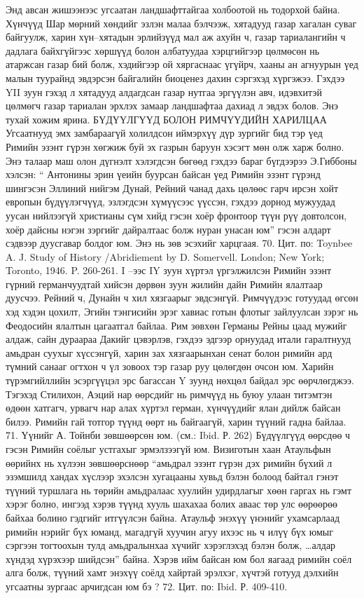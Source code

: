 Энд авсан жишээнээс угсаатан ландшафттайгаа холбоотой нь тодорхой байна. Хүнчүүд Шар мөрний хөндийг эзлэн малаа бэлчээж, хятадууд газар хагалан суваг байгуулж, харин хүн–хятадын эрлийзүүд мал аж ахуйн ч, газар тариалангийн ч дадлага байхгүйгээс хөршүүд болон албатуудаа хэрцгийгээр цөлмөсөн нь атаржсан газар бий болж, хэдийгээр ой хяргаснаас үгүйрч, хааны ан агнуурын үед малын туурайнд эвдэрсэн байгалийн биоценез дахин сэргэхэд хүргэжээ. Гэхдээ YII зуун гэхэд л хятадууд алдагдсан газар нутгаа эргүүлэн авч, идэвхитэй цөлмөгч газар тариалан эрхлэх замаар ландшафтаа дахиад л эвдэх болов. Энэ тухай хожим ярина.
БҮДҮҮЛГҮҮД БОЛОН РИМЧҮҮДИЙН ХАРИЛЦАА
Угсаатнууд эмх замбараагүй холилдсон иймэрхүү дүр зургийг бид тэр үед Римийн эзэнт гүрэн хөгжиж буй эх газрын баруун хэсэгт мөн олж харж болно. Энэ талаар маш олон дүгнэлт хэлэгдсэн бөгөөд гэхдээ бараг бүгдээрээ Э.Гиббоны хэлсэн: “ Антонины эрин үеийн буурсан байсан үед Римийн эзэнт гүрэнд шингэсэн Эллиний нийгэм Дунай, Рейний чанад дахь цөлөөс гарч ирсэн хойт европын бүдүүлэгчүүд, эзлэгдсэн хүмүүсээс үүссэн, гэхдээ дорнод мужуудад уусан нийлээгүй христианы сүм хийд гэсэн хоёр фронтоор түүн рүү довтолсон, хоёр дайсны нэгэн зэргийг дайралтаас болж нуран унасан юм” гэсэн алдарт сэдвээр дуусгавар болдог юм. Энэ нь зөв эсэхийг харцгаая. 70. Цит. по: Toynbee A. J. Study of History /Abridiement by D. Somervell. London; New York; Toronto, 1946. P. 260-261.
I –ээс IY зуун хүртэл үргэлжилсэн Римийн эзэнт гүрний германчуудтай хийсэн дөрвөн зуун жилийн дайн Римийн ялалтаар дуусчээ. Рейний ч, Дунайн ч хил хязгаарыг эвдсэнгүй. Римчүүдээс готуудад өгсөн хэд хэдэн цохилт, Эгийн тэнгисийн эрэг хавиас готын флотыг зайлуулсан зэрэг нь Феодосийн ялалтын цагаатгал байлаа. Рим зөвхөн Германы Рейны цаад мужийг алдаж, сайн дураараа Дакийг цэвэрлэв, гэхдээ эдгээр орнуудад итали гаралтнууд амьдран суухыг хүссэнгүй, харин зах хязгаарынхан сенат болон римийн ард түмний санааг огтхон ч үл зовоох тэр газар руу цөлөгдөн очсон юм. Харийн түрэмгийллийн эсэргүүцэл эрс багассан Y зуунд нөхцөл байдал эрс өөрчлөгджээ. Тэгэхэд Стилихон, Аэций нар өөрсдийг нь римчүүд нь буюу улаан титэмтэн өдөөн хатгагч, урвагч нар алах хүртэл герман, хүнчүүдийг ялан дийлж байсан билээ. Римийн гай тотгор түүнд өөрт нь байгаагүй, харин түүний гадна байлаа. 71. Үүнийг А. Тойнби зөвшөөрсөн юм. (см.: Ibid. Р. 262)
Бүдүүлгүүд өөрсдөө ч гэсэн Римийн соёлыг устгахыг эрмэлзээгүй юм. Визиготын хаан Атаульфын өөрийнх нь хүлээн зөвшөөрснөөр “амьдрал эзэнт гүрэн дэх римийн бүхий л эзэмшилд хандах хүслээр эхэлсэн хугацааны хувьд бэлэн болоод байтал гэнэт түүний туршлага нь төрийн амьдралаас хуулийн удирдлагыг хөөн гаргах нь гэмт хэрэг болно, ингээд хэрэв түүнд хууль шахахаа болих аваас төр улс өөрөөрөө байхаа болино гэдгийг итгүүлсэн байна. Атаульф энэхүү үнэнийг ухамсарлаад римийн нэрийг бүх юманд, магадгүй хуучин агуу ихээс нь ч илүү бүх юмыг сэргээн тогтоохын тулд амьдралынхаа хүчийг хэрэглэхэд бэлэн болж, …алдар хүндэд хүрэхээр шийдсэн” байна. Хэрэв ийм байсан юм бол яагаад римийн соёл алга болж, түүний хамт энэхүү соёлд хайртай эрэлхэг, хүчтэй готууд дэлхийн угсаатны зургаас арчигдсан юм бэ ? 72. Цит. по: Ibid. Р. 409-410.
